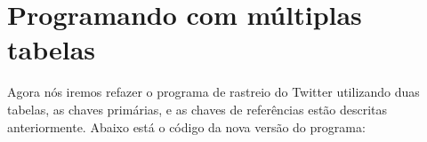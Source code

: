 \section{Programando com múltiplas tabelas}


Agora nós iremos refazer o programa de rastreio do Twitter utilizando duas
tabelas, as chaves primárias, e as chaves de referências estão descritas
anteriormente. Abaixo está o código da nova versão do programa:

